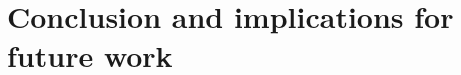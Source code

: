
\section{Conclusion and implications for future work}
\label{sec:synth:future}

%
%
%
%   
%
%

















\newpage

